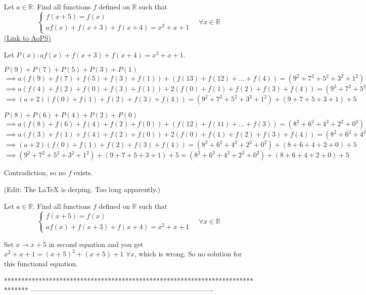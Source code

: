 \begin{problem}
	Let $a\in\mathbb R$. Find all functions $f$ defined on $\mathbb R$ such that \[\begin{cases}f(x+5)=f(x)\\af(x)+f(x+3)+f(x+4)=x^2+x+1\end{cases}\quad \forall x\in\mathbb R\]
	\flushright \href{https://artofproblemsolving.com/community/c6h569514}{(Link to AoPS)}
\end{problem}



\begin{solution}
	Let $P(x) : af(x) + f(x+3) + f(x+4) = x^2 + x + 1$.

$P(9) + P(7) + P(5) + P(3) + P(1)$
$\implies a(f(9) + f(7) + f(5) + f(3) + f(1)) + (f(13)+f(12)+\ldots+f(4)) = (9^2+7^2+5^2+3^2+1^2) + (9+7+5+3+1) + 5$
$\implies a(f(4) + f(2) + f(0) + f(3) + f(1)) + 2(f(0)+f(1)+f(2)+f(3)+f(4)) = (9^2+7^2+5^2+3^2+1^2) + (9+7+5+3+1) + 5$
$\implies (a+2) (f(0)+f(1)+f(2)+f(3)+f(4)) = (9^2+7^2+5^2+3^2+1^2) + (9+7+5+3+1) + 5$

$P(8) + P(6) + P(4) + P(2) + P(0)$
$\implies a(f(8) + f(6) + f(4) + f(2) + f(0)) + (f(12)+f(11)+\ldots+f(3)) = (8^2+6^2+4^2+2^2+0^2) + (8+6+4+2+0) + 5$
$\implies a(f(3) + f(1) + f(4) + f(2) + f(0)) + 2(f(0)+f(1)+f(2)+f(3)+f(4)) = (8^2+6^2+4^2+2^2+0^2) + (8+6+4+2+0) + 5$
$\implies (a+2) (f(0)+f(1)+f(2)+f(3)+f(4)) = (8^2+6^2+4^2+2^2+0^2) + (8+6+4+2+0) + 5$
$\implies (9^2+7^2+5^2+3^2+1^2) + (9+7+5+3+1) + 5 = (8^2+6^2+4^2+2^2+0^2) + (8+6+4+2+0) + 5$

Contradiction, so no $f$ exists.

(Edit: The LaTeX is derping. Too long apparently.)
\end{solution}



\begin{solution}
	\begin{tcolorbox}Let $a\in\mathbb R$. Find all functions $f$ defined on $\mathbb R$ such that \[\begin{cases}f(x+5)=f(x)\\af(x)+f(x+3)+f(x+4)=x^2+x+1\end{cases}\quad \forall x\in\mathbb R\]\end{tcolorbox}
Set $x\to x+5$ in second equation and you get $x^2+x+1=(x+5)^2+(x+5)+1$ $\forall x$, which is wrong.
So no solution for this functional equation.
\end{solution}
*******************************************************************************
-------------------------------------------------------------------------------


